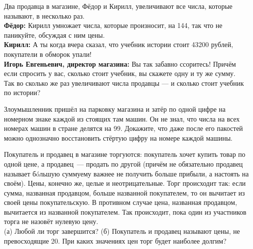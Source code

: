 ﻿
\begin{enumerate}
\itA Два продавца в магазине, Фёдор и Кирилл, увеличивают все числа, которые называют, в несколько раз. \smallskip\\
{\bfseries Фёдор:} Кирилл умножает числа, которые произносит, на 144, так что не паникуйте, обсуждая с ним цены. \smallskip\\
{\bfseries Кирилл:} А ты когда вчера сказал, что учебник истории стоит 43200 рублей, покупатели в обморок упали! \smallskip\\
{\bfseries Игорь Евгеньевич, директор магазина:} Вы так забавно ссоритесь! Причём если спросить у вас, сколько стоит учебник, вы скажете одну и ту же сумму. \smallskip\\
Так во сколько же раз увеличивают числа продавцы — и сколько стоит учебник по истории?

\itB Злоумышленник пришёл на парковку магазина и затёр по одной цифре на номерном знаке каждой из стоящих там машин. Он не знал, что числа на всех номерах машин в стране делятся на 99. Докажите, что даже после его пакостей можно однозначно восстановить стёртую цифру на номере каждой машины.

\itC Покупатель и продавец в магазине торгуются: покупатель хочет купить товар по одной цене, а продавец~— продать по другой (причём не обязательно продавец называет б\'oльшую сумму\scolon ему важнее не получить больше прибыли, а настоять на своём). Цены, конечно же, целые и неотрицательные. Торг происходит так: если сумма, названная продавцом, больше названной покупателем, то он вычитает из своей цены покупательскую. В противном случае цена, названная продавцом, вычитается из названной покупателем. Так происходит, пока один из участников торга не назовёт нулевую цену. \smallskip\\
(а) Любой ли торг завершится? (б) Покупатель и продавец называют цены, не превосходящие 20. При каких значениях цен торг будет наиболее долгим?
\end{enumerate}
